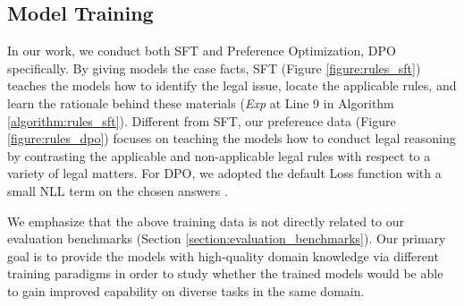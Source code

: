 \subsection{Model Training}
\label{section:model_training}

In our work, we conduct both SFT and Preference Optimization, DPO \cite{DBLP:conf/nips/RafailovSMMEF23} specifically. By giving models the case facts, SFT (Figure \ref{figure:rules_sft}) teaches the models how to identify the legal issue, locate the applicable rules, and learn the rationale behind these materials (\textit{Exp} at Line 9 in Algorithm \ref{algorithm:rules_sft}). Different from SFT, our preference data (Figure \ref{figure:rules_dpo}) focuses on teaching the models how to conduct legal reasoning by contrasting the applicable and non-applicable legal rules with respect to a variety of legal matters. For DPO, we adopted the default Loss function with a small NLL term on the chosen answers \cite{DBLP:journals/corr/abs-2404-19733}.

We emphasize that the above training data is not directly related to our evaluation benchmarks (Section \ref{section:evaluation_benchmarks}). Our primary goal is to provide the models with high-quality domain knowledge via different training paradigms in order to study whether the trained models would be able to gain improved capability on diverse tasks in the same domain.
